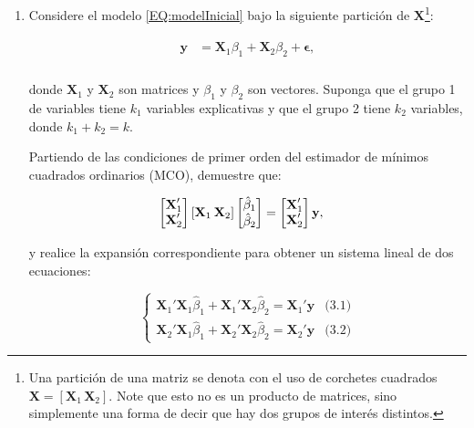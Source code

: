\documentclass[a4paper, answers, addpoints, 11pt]{exam}
\begin{document}
\begin{enumerate}
   

    \item Considere el modelo \eqref{EQ:modelInicial} bajo la siguiente partición de $\mathbf{X}$\footnote{Una partición de una matriz se denota con el uso de corchetes cuadrados $\mathbf{X} = [\mathbf{X}_1 \, \mathbf{X}_2]$. Note que esto no es un producto de matrices, sino simplemente una forma de decir que hay dos grupos de interés distintos.}:

    \begin{align}
    \begin{split}
        \textbf{y} &= \textbf{X}_1 \beta_1 + \textbf{X}_2 \beta_2 + \boldsymbol\epsilon, \label{EQ:modelParticionado} \\
    \end{split}
    \end{align}

    donde $\textbf{X}_1$ y $\textbf{X}_2$ son matrices y $\beta_1$ y $\beta_2$ son vectores. Suponga que el grupo 1 de variables tiene $k_1$ variables explicativas y que el grupo 2 tiene $k_2$ variables, donde $k_1 + k_2 = k$.

    Partiendo de las condiciones de primer orden del estimador de mínimos cuadrados ordinarios (MCO), demuestre que:

    \begin{align}
        \begin{bmatrix}
            \textbf{X}_{1}' \\
            \textbf{X}_{2}'
        \end{bmatrix} 
            [ \textbf{X}_1  \hspace{0.2em}  \textbf{X}_2 ]
        \begin{bmatrix}
            \hat\beta_1 \\
            \hat\beta_2
        \end{bmatrix} &= 
        \begin{bmatrix}
            \textbf{X}_{1}' \\
            \textbf{X}_{2}'
        \end{bmatrix}
        \textbf{y},\label{EQ:particionado}
    \end{align}

     y realice la expansión correspondiente para obtener un sistema lineal de dos ecuaciones: 

    \begin{equation}
    \begin{cases}
    \textbf{X}_{1}'\textbf{X}_{1}\hat{\beta}_1 + \textbf{X}_{1}'\textbf{X}_{2}\hat{\beta}_2 = \textbf{X}_{1}'\textbf{y} & \text{(3.1)} \\
    \textbf{X}_{2}'\textbf{X}_{1}\hat{\beta}_1 + \textbf{X}_{2}'\textbf{X}_{2}\hat{\beta}_2 = \textbf{X}_{2}'\textbf{y} & \text{(3.2)}
    \end{cases}
    \end{equation}


\end{enumerate}
\end{document}
